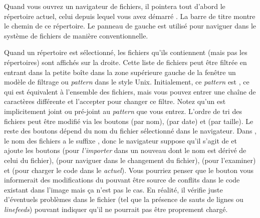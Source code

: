 \documentclass[a4paper,10pt,twoside]{book}
\begin{document}
Quand vous ouvrez un navigateur de fichiers, il pointera tout d'abord le répertoire
actuel, \ie celui depuis lequel vous avez démarré \pharo. La barre de titre
montre le chemin de ce répertoire.
Le panneau de gauche est utilisé pour naviguer dans le système de fichiers de manière
conventionnelle.

Quand un répertoire est sélectionné, les fichiers qu'ils contiennent (mais pas les répertoires) 
sont affichés sur la droite. Cette liste de fichiers peut être filtrée en entrant dans la petite boîte
dans la zone supérieure gauche de la fenêtre un modèle de filtrage ou 
\emph{pattern} dans le style Unix.
Initialement, ce \emph{pattern} est \ct{*}, ce qui est équivalent à l'ensemble des fichiers, mais vous 
pouvez entrer une chaîne de caractères différente et l'accepter pour changer ce filtre. 
Notez qu'un \ct{*} est implicitement joint ou pré-joint au \emph{pattern}
que vous entrez.
L'ordre de tri des fichiers peut être modifié via les boutons  (par nom), 
 (par date) et  (par taille).
Le reste des boutons dépend du nom du fichier sélectionné dans le navigateur.
Dans , le nom des fichiers a le suffixe , donc le navigateur
suppose qu'il s'agit de \changeset et ajoute les boutons  (pour
\textit{l'importer} dans un nouveau \changeset dont le nom est dérivé
de celui du fichier),  (pour naviguer dans le changement du fichier),
 (pour l'examiner) et  (pour charger
le code dans le \changeset \emph{actuel}).
Vous pourriez penser que le bouton  vous informerait 
des modifications du \changeset pouvant être source de conflits dans le code existant
dans l'image mais ça n'est pas le cas.
En réalité, il vérifie juste d'éventuels problèmes dans le fichier (tel que
la présence de sauts de lignes ou \textit{linefeeds})
pouvant indiquer qu'il ne pourrait pas être proprement chargé.
\end{document}
